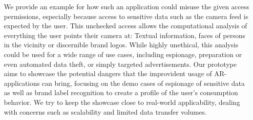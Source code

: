 We provide an example for how such an application could misuse the given access permissions, especially because access to sensitive data such as the camera feed is expected by the user.
This unchecked access allows the computational analysis of everything the user points their camera at: Textual information, faces of persons in the vicinity or discernible brand logos.
While highly unethical, this analysis could be used for a wide range of use cases, including espionage, preparation or even automated data theft, or simply targeted advertisements.
Our prototype aims to showcase the potential dangers that the improvident usage of AR-applications can bring, focusing on the demo cases of espionage of sensitive data as well as brand label recognition to create a profile of the user's consumption behavior.
We try to keep the showcase close to real-world applicability, dealing with concerns such as scalability and limited data transfer volumes.

